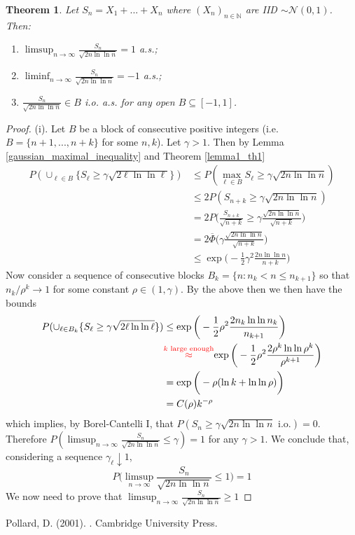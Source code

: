 \documentclass{article}
\theoremstyle{plain}%
\newtheorem{theorem}{Theorem}[section]
\theoremstyle{definition}
\theoremstyle{remark}
\begin{document}
\begin{theorem}
	\label{lil_gauss}
	Let $S_n=X_1+...+X_n$ where $(X_n)_{n \in \mathbb{N}}$ are IID $\sim \mathcal{N}(0,1)$. Then:
	\begin{enumerate}
		\item $\limsup_{n\to \infty}\frac{S_n}{\sqrt{2n \ln \ln n}}=1$ a.s.;
		\item $\liminf_{n\to \infty}\frac{S_n}{\sqrt{2n \ln \ln n}}=-1$ a.s.;
		\item $\frac{S_n}{\sqrt{2n \ln \ln n}}\in B$ i.o. a.s. for any open $B\subseteq [-1,1]$.
	\end{enumerate}	
\end{theorem}
\begin{proof} (i). Let $B$ be a block of consecutive positive integers (i.e. $B=\{n+1,...,n+k\}$ for some $n,k$). Let $\gamma >1$. Then by Lemma \ref{gaussian_maximal_inequality} and Theorem \ref{lemma1_th1}
$$\begin{aligned}
P(\cup_{\ell \in B}\{S_\ell\geq \gamma \sqrt{2\ell \ln \ln \ell}\})&\leq P(\max_{\ell \in B}S_\ell\geq \gamma \sqrt{2n \ln \ln n})\\
&\leq 2P(S_{n+k}\geq \gamma \sqrt{2n \ln \ln n})\\
&=2P\bigg(\frac{S_{n+k}}{\sqrt{n+k}}\geq \gamma\frac{\sqrt{2n \ln \ln n}}{\sqrt{n+k}}\bigg)\\
&=2\overline{\Phi}\bigg(\gamma\frac{\sqrt{2n \ln \ln n}}{\sqrt{n+k}}\bigg)\\
&\leq \exp\bigg(-\frac{1}{2}\gamma^2\frac{{2n \ln \ln n}}{n+k}\bigg)
\end{aligned}$$
Now consider a sequence of consecutive blocks $B_k=\{n:n_k<n\leq n_{k+1}\}$ so that $n_k/\rho^k\to 1$ for some constant $\rho\in (1,\gamma)$. By the above then we then have the bounds
$$\begin{aligned}P(\cup_{\ell \in B_k}\{S_\ell\geq \gamma \sqrt{2\ell \ln \ln \ell}\})&\leq \exp\bigg(-\frac{1}{2}\rho^2\frac{{2n_k \ln \ln n_k}}{n_{k+1}}\bigg)\\
&\color{red}{\stackrel{k\textrm{ large enough}}{\approx}}\color{black}{
\exp\bigg(-\frac{1}{2}\rho^2\frac{{2\rho^k \ln \ln \rho^k}}{\rho^{k+1}}\bigg)}\\
&=\exp\bigg(-\rho (\ln k + \ln \ln \rho)\bigg)\\
&=C(\rho)k^{-\rho}
\end{aligned}$$
which implies, by Borel-Cantelli I, that $P(S_n\geq \gamma \sqrt{2n \ln \ln n} \textrm{ i.o.})=0$. Therefore $P(\limsup_{n \to \infty}\frac{S_n}{\sqrt{2n \ln \ln n}}\leq \gamma )=1$ for any $\gamma>1$. We conclude that, considering a sequence $\gamma_\ell\downarrow 1$,
$$P\bigg(\limsup_{n \to \infty}\frac{S_n}{\sqrt{2n \ln \ln n}}\leq 1 \bigg)=1$$
We now need to prove that $\limsup_{n \to \infty}\frac{S_n}{\sqrt{2n \ln \ln n}}\geq 1$
	
\end{proof}

\newpage 

\begin{thebibliography}{99}
	
    Pollard, D. (2001).
	.
	\newblock Cambridge University Press.
	
\end{thebibliography}
\end{document}
